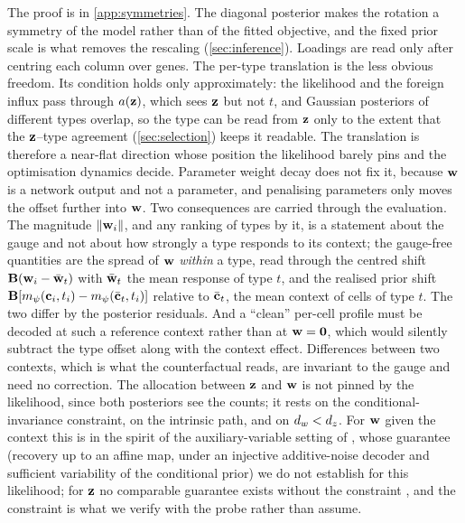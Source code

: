  \noindent The proof is in \cref{app:symmetries}. The diagonal posterior makes the rotation a symmetry of the model rather than of the fitted objective, and the fixed prior scale is what removes the rescaling (\cref{sec:inference}). Loadings are read only after centring each column over genes. The per-type translation is the less obvious freedom. Its condition holds only approximately: the likelihood and the foreign influx pass through $a(\mathbf{z})$, which sees $\mathbf{z}$ but not $t$, and Gaussian posteriors of different types overlap, so the type can be read from $\mathbf{z}$ only to the extent that the $\mathbf{z}$--type agreement (\cref{sec:selection}) keeps it readable. The translation is therefore a near-flat direction whose position the likelihood barely pins and the optimisation dynamics decide. Parameter weight decay does not fix it, because $\mathbf{w}$ is a network output and not a parameter, and penalising parameters only moves the offset further into $\mathbf{w}$. Two consequences are carried through the evaluation. The magnitude $\|\mathbf{w}_i\|$, and any ranking of types by it, is a statement about the gauge and not about how strongly a type responds to its context; the gauge-free quantities are the spread of $\mathbf{w}$ \emph{within} a type, read through the centred shift $\mathbf{B}(\mathbf{w}_i - \bar{\mathbf{w}}_t)$ with $\bar{\mathbf{w}}_t$ the mean response of type $t$, and the realised prior shift $\mathbf{B}[m_{\psi}(\mathbf{c}_i,t_i) - m_{\psi}(\bar{\mathbf{c}}_t,t_i)]$ relative to $\bar{\mathbf{c}}_t$, the mean context of cells of type $t$. The two differ by the posterior residuals. And a ``clean'' per-cell profile must be decoded at such a reference context rather than at $\mathbf{w} = \mathbf{0}$, which would silently subtract the type offset along with the context effect. Differences between two contexts, which is what the counterfactual reads, are invariant to the gauge and need no correction. The allocation between $\mathbf{z}$ and $\mathbf{w}$ is not pinned by the likelihood, since both posteriors see the counts; it rests on the conditional-invariance constraint, on the intrinsic path, and on $d_w < d_z$. For $\mathbf{w}$ given the context this is in the spirit of the auxiliary-variable setting of \citet{khemakhem2020}, whose guarantee (recovery up to an affine map, under an injective additive-noise decoder and sufficient variability of the conditional prior) we do not establish for this likelihood; for $\mathbf{z}$ no comparable guarantee exists without the constraint \citep{locatello2019}, and the constraint is what we verify with the probe rather than assume.

